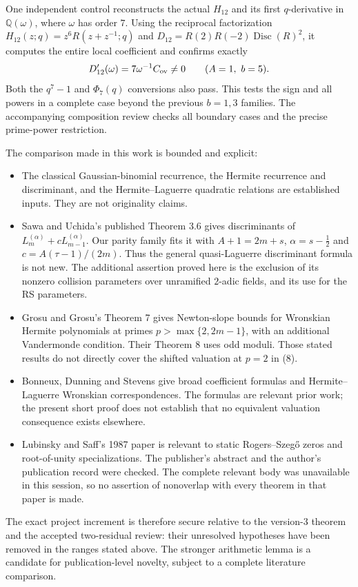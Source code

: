 \documentclass[11pt]{article}
\theoremstyle{remark}\newtheorem{remark}[theorem]{Remark}
\newcommand{\Disc}{\operatorname{Disc}}
\newcommand{\Q}{\mathbb{Q}}
\begin{document}
One independent control reconstructs the actual $H_{12}$ and its first
$q$-derivative in $\Q(\omega)$, where $\omega$ has order $7$.
Using the reciprocal factorization
$H_{12}(z;q)=z^6R(z+z^{-1};q)$ and
$D_{12}=R(2)R(-2)\Disc(R)^2$, it computes the entire local
coefficient and confirms exactly
\[
D_{12}'(\omega)=7\omega^{-1}C_{\rm ov}\ne0
\qquad(A=1,\ b=5).
\]
Both the $q^7-1$ and $\Phi_7(q)$ conversions also pass.
This tests the sign and all powers in a complete case beyond the
previous $b=1,3$ families. The accompanying composition review checks
all boundary cases and the precise prime-power restriction.

The comparison made in this work is bounded and explicit:
\begin{itemize}
\item The classical Gaussian-binomial recurrence, the Hermite
recurrence and discriminant, and the Hermite--Laguerre quadratic
relations are established inputs. They are not originality claims.
\item Sawa and Uchida's published Theorem 3.6 gives discriminants of
$L_m^{(\alpha)}+cL_{m-1}^{(\alpha)}$. Our parity family fits it with
$A+1=2m+s$, $\alpha=s-\tfrac12$ and
$c=A(\tau-1)/(2m)$. Thus the general quasi-Laguerre discriminant
formula is not new. The additional assertion proved here is the
exclusion of its nonzero collision parameters over unramified
$2$-adic fields, and its use for the RS parameters.
\item Grosu and Grosu's Theorem 7 gives Newton-slope bounds for
Wronskian Hermite polynomials at primes
$p>\max\{2,2m-1\}$, with an additional Vandermonde condition.
Their Theorem 8 uses odd moduli. Those stated results do not
directly cover the shifted valuation at $p=2$ in (8).
\item Bonneux, Dunning and Stevens give broad coefficient formulas
and Hermite--Laguerre Wronskian correspondences. The formulas are
relevant prior work; the present short proof does not establish
that no equivalent valuation consequence exists elsewhere.
\item Lubinsky and Saff's 1987 paper is relevant to static
Rogers--Szeg\H{o} zeros and root-of-unity specializations.
The publisher's abstract and the author's publication record were
checked. The complete relevant body was unavailable in this session,
so no assertion of nonoverlap with every theorem in that paper
is made.
\end{itemize}

The exact project increment is therefore secure relative to the
version-3 theorem and the accepted two-residual review: their
unresolved hypotheses have been removed in the ranges stated above.
The stronger arithmetic lemma is a candidate for publication-level
novelty, subject to a complete literature comparison.
\end{document}
